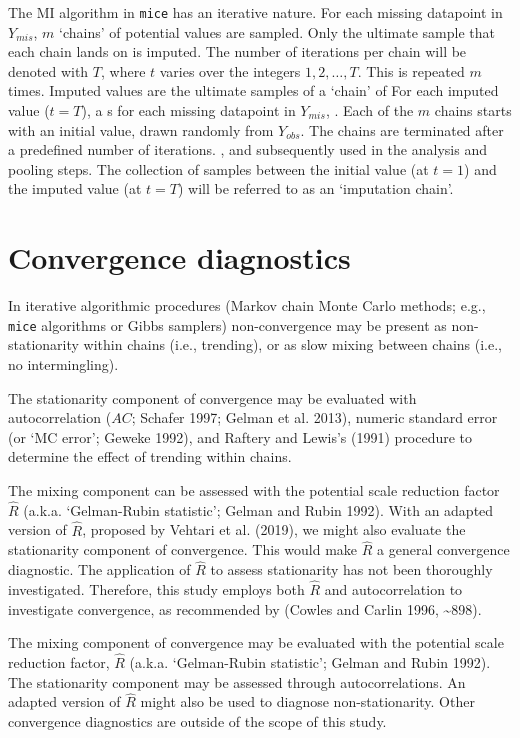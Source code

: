 \documentclass[
  Royal, times, sageapa]{sagej}
\begin{document}
The MI algorithm in \texttt{mice} has an iterative nature. For each
missing datapoint in \(Y_{mis}\), \(m\) `chains' of potential values are
sampled. Only the ultimate sample that each chain lands on is imputed.
The number of iterations per chain will be denoted with \(T\), where
\(t\) varies over the integers \(1, 2, \dots, T\). This is repeated
\(m\) times. Imputed values are the ultimate samples of a `chain' of For
each imputed value (\(t = T\)), a s for each missing datapoint in
\(Y_{mis}\), . Each of the \(m\) chains starts with an initial value,
drawn randomly from \(Y_{obs}\). The chains are terminated after a
predefined number of iterations. , and subsequently used in the analysis
and pooling steps. The collection of samples between the initial value
(at \(t=1\)) and the imputed value (at \(t=T\)) will be referred to as
an `imputation chain'.

\hypertarget{convergence-diagnostics}{%
\section{Convergence diagnostics}\label{convergence-diagnostics}}

In iterative algorithmic procedures (Markov chain Monte Carlo methods;
e.g., \texttt{mice} algorithms or Gibbs samplers) non-convergence may be
present as non-stationarity within chains (i.e., trending), or as slow
mixing between chains (i.e., no intermingling).

The stationarity component of convergence may be evaluated with
autocorrelation (\(AC\); Schafer 1997; Gelman et al. 2013), numeric
standard error (or `MC error'; Geweke 1992), and Raftery and Lewis's
(1991) procedure to determine the effect of trending within chains.

The mixing component can be assessed with the potential scale reduction
factor \(\widehat{R}\) (a.k.a. `Gelman-Rubin statistic'; Gelman and
Rubin 1992). With an adapted version of \(\widehat{R}\), proposed by
Vehtari et al. (2019), we might also evaluate the stationarity component
of convergence. This would make \(\widehat{R}\) a general convergence
diagnostic. The application of \(\widehat{R}\) to assess stationarity
has not been thoroughly investigated. Therefore, this study employs both
\(\widehat{R}\) and autocorrelation to investigate convergence, as
recommended by (Cowles and Carlin 1996, \textasciitilde898).

The mixing component of convergence may be evaluated with the potential
scale reduction factor, \(\widehat{R}\) (a.k.a. `Gelman-Rubin
statistic'; Gelman and Rubin 1992). The stationarity component may be
assessed through autocorrelations. An adapted version of \(\widehat{R}\)
might also be used to diagnose non-stationarity. Other convergence
diagnostics are outside of the scope of this study.
\end{document}
